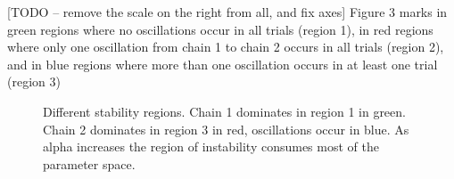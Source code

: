 \documentclass[10pt, preprint]{aastex}
\begin{document}
[TODO -- remove the scale on the right from all, and fix axes]
Figure 3 marks in green regions where no oscillations occur in all trials (region 1), in red regions where only one oscillation from chain 1 to chain 2 occurs in all trials (region 2), and in blue regions where more than one oscillation occurs in at least one trial (region 3)
\begin{figure}
	\centering
	\qquad
	\qquad
	\qquad
	\qquad
	\caption{Different stability regions.  Chain 1 dominates in region 1 in green.  Chain 2 dominates in region 3 in red, oscillations occur in blue.  As alpha increases the region of instability consumes most of the parameter space.}
\end{figure}
\end{document}
